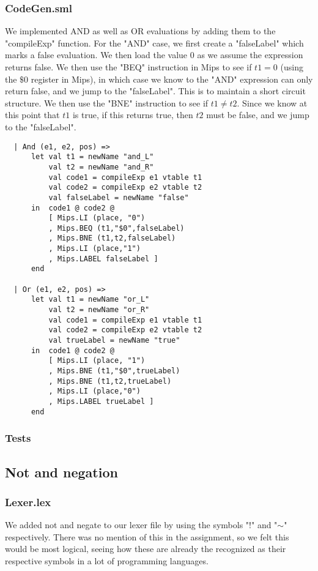 \documentclass[12pt]{article}
\begin{document}
\subsubsection{CodeGen.sml}
We implemented AND as well as OR evaluations by adding them to the "compileExp" function. For the "AND" case, we first create a "falseLabel" which marks a false evaluation. We then load the value 0 as we assume the expression returns false. We then use the "BEQ" instruction in Mips to see if \(t1 = 0\) (using the \(\$0\) register in Mips), in which case we know to the "AND" expression can only return false, and we jump to the "falseLabel". This is to maintain a short circuit structure. We then use the "BNE" instruction to see if \(t1\neq t2\). Since we know at this point that \(t1\) is true, if this returns true, then \(t2\) must be false, and we jump to the "falseLabel". 
\begin{verbatim}
  | And (e1, e2, pos) =>
      let val t1 = newName "and_L"
          val t2 = newName "and_R"
          val code1 = compileExp e1 vtable t1
          val code2 = compileExp e2 vtable t2
          val falseLabel = newName "false"
      in  code1 @ code2 @
          [ Mips.LI (place, "0")
          , Mips.BEQ (t1,"$0",falseLabel)
          , Mips.BNE (t1,t2,falseLabel)
          , Mips.LI (place,"1") 
          , Mips.LABEL falseLabel ]
      end
      
  | Or (e1, e2, pos) =>
      let val t1 = newName "or_L"
          val t2 = newName "or_R"
          val code1 = compileExp e1 vtable t1
          val code2 = compileExp e2 vtable t2
          val trueLabel = newName "true"
      in  code1 @ code2 @
          [ Mips.LI (place, "1")
          , Mips.BNE (t1,"$0",trueLabel)
          , Mips.BNE (t1,t2,trueLabel)
          , Mips.LI (place,"0")
          , Mips.LABEL trueLabel ]
      end

\end{verbatim}
\subsubsection{Tests}
\subsection{Not and negation}
\subsubsection{Lexer.lex}
We added not and negate to our lexer file by using the symbols "!" and "$\sim$" respectively. There was no mention of this in the assignment, so we felt this would be most logical, seeing how these are already the recognized as their respective symbols in a lot of programming languages.
\end{document}
